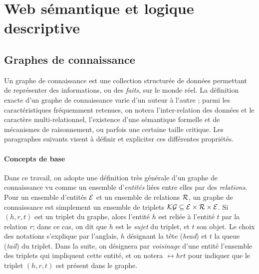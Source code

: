 \label{chap:revue}


\section{Web sémantique et logique descriptive}
\label{sec:dl}

\subsection{Graphes de connaissance}





Un graphe de connaissance est une collection structurée de données permettant de représenter des informations, ou des \textit{faits}, sur le monde réel. La définition exacte d'un graphe de connaissance varie d'un auteur à l'autre \cite{ehrlinger2016towards}; parmi les caractéristiques fréquemment retenues, on notera l'inter-relation des données et le caractère multi-relationnel, l'existence d'une sémantique formelle et de mécanismes de raisonnement, ou parfois une certaine taille critique. Les paragraphes suivants visent à définir et expliciter ces différentes propriétés.


\paragraph{Concepts de base}

Dans ce travail, on adopte une définition très générale d'un graphe de connaissance vu comme un ensemble d'\textit{entités} liées entre elles par des \textit{relations}. Pour un ensemble d'entités $\mathcal{E}$ et un ensemble de relations $\mathcal{R}$, un graphe de connaissance est simplement un ensemble de triplets $\mathcal{KG} \subseteq \mathcal{E} \times \mathcal{R} \times \mathcal{E}$. Si $(h, r, t)$ est un triplet du graphe, alors l'entité $h$ est reliée à l'entité $t$ par la relation $r$; dans ce cas, on dit que $h$ est le \textit{sujet} du triplet, et $t$ son objet. Le choix des notations s'explique par l'anglais, $h$ désignant la tête (\textit{head}) et $t$ la queue (\textit{tail}) du triplet. Dans la suite, on désignera par \textit{voisinage} d'une entité l'ensemble des triplets qui impliquent cette entité, et on notera $\rel{h}{r}{t}$ pour indiquer que le triplet $(h, r, t)$ est présent dans le graphe.

